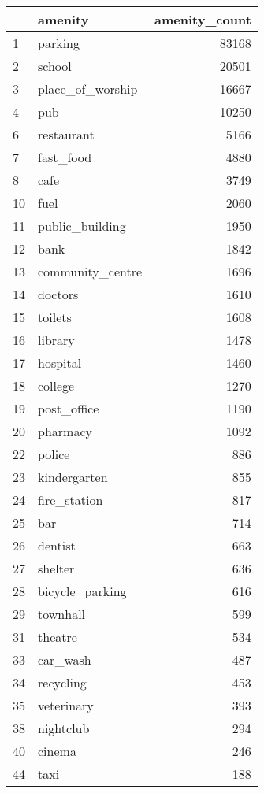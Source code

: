 \begin{tabular}{llr}
\toprule
{} &           amenity &  amenity\_count \\
\midrule
1  &           parking &          83168 \\
2  &            school &          20501 \\
3  &  place\_of\_worship &          16667 \\
4  &               pub &          10250 \\
6  &        restaurant &           5166 \\
7  &         fast\_food &           4880 \\
8  &              cafe &           3749 \\
10 &              fuel &           2060 \\
11 &   public\_building &           1950 \\
12 &              bank &           1842 \\
13 &  community\_centre &           1696 \\
14 &           doctors &           1610 \\
15 &           toilets &           1608 \\
16 &           library &           1478 \\
17 &          hospital &           1460 \\
18 &           college &           1270 \\
19 &       post\_office &           1190 \\
20 &          pharmacy &           1092 \\
22 &            police &            886 \\
23 &      kindergarten &            855 \\
24 &      fire\_station &            817 \\
25 &               bar &            714 \\
26 &           dentist &            663 \\
27 &           shelter &            636 \\
28 &   bicycle\_parking &            616 \\
29 &          townhall &            599 \\
31 &           theatre &            534 \\
33 &          car\_wash &            487 \\
34 &         recycling &            453 \\
35 &        veterinary &            393 \\
38 &         nightclub &            294 \\
40 &            cinema &            246 \\
44 &              taxi &            188 \\
\bottomrule
\end{tabular}
